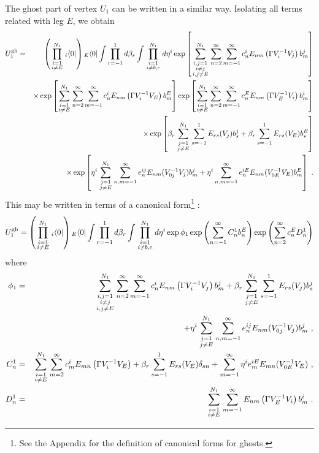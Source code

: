 \documentclass[a4paper,11pt]{article}
\begin{document}
The ghost part of vertex $U_1$ can be written in a similar way. Isolating all terms related with leg $E$, we obtain
\begin{eqnarray}
U^{\rm gh}_1 & = & \left( \prod_{\scriptstyle i=1\atop \scriptstyle i\neq E}^{N_1}{ }_i\langle 0|\right) { }_E\langle 0|\int \prod_{r=-1}^1d\beta _r\int \prod_{\scriptstyle i=1\atop \scriptstyle i\neq b,c}^{N_1}d\eta ^i \exp \left[ \sum_{{\scriptstyle i,j=1\atop \scriptstyle i\neq j}\atop \scriptstyle i,j\neq E}^{N_1}\sum_{n=2}^\infty \sum_{m=-1}^\infty c_n^iE_{nm}\left( \Gamma V^{-1}_iV_j\right) b_m^j\right] \nonumber \\
 & & \times \exp \left[ \sum_{\scriptstyle i=1\atop \scriptstyle i\neq E}^{N_1}\sum_{n=2}^\infty \sum_{m=-1}^\infty c_n^iE_{nm}\left( \Gamma V^{-1}_iV_E\right) b_m^E\right] \exp \left[ \sum_{\scriptstyle i=1\atop \scriptstyle i\neq E}^{N_1}\sum_{n=2}^\infty \sum_{m=-1}^\infty c_n^EE_{nm}\left( \Gamma V^{-1}_EV_i\right) b_m^i\right] \nonumber \\
 & & \times \exp \left[ \beta _r\sum_{\scriptstyle j=1\atop \scriptstyle j\neq E}^{N_1}\sum_{s=-1}^1E_{rs}(V_j)b_s^j+\beta _r\sum_{s=-1}^1E_{rs}(V_E)b_s^E\right] \nonumber \\
 & & \times \exp \left[ \eta ^i\sum_{\scriptstyle j=1\atop \scriptstyle j\neq E}^{N_1}\sum_{n,m=-1}^\infty e_n^{ij}E_{nm}(V_{0j}^{-1}V_j)b_m^j +\eta ^i\sum_{n,m=-1}^\infty e_n^{iE}E_{nm}(V_{0E}^{-1}V_E)b_m^E\right] \ .
\end{eqnarray}
This may be written in terms of a canonical form\footnote{See the Appendix for the definition of canonical forms for ghosts.} \cite{cg2}:
\begin{equation}
U^{\rm gh}_1 = \left( \prod_{\scriptstyle i=1\atop \scriptstyle i\neq E}^{N_1}{ }_i\langle 0|\right) { }_E\langle 0|\int \prod_{r=-1}^1d\beta _r\int \prod_{\scriptstyle i=1\atop \scriptstyle i\neq b,c}^{N_1}d\eta ^i \exp {\phi _1}\exp \left( \sum_{n=-1}^\infty C_n^1b_n^E\right) \exp \left( \sum_{n=2}^\infty c_n^ED_n^1\right) 
\end{equation}
where
\begin{eqnarray}
\phi _1 & = & \sum_{{\scriptstyle i,j=1\atop \scriptstyle i\neq j}\atop \scriptstyle i,j\neq E}^{N_1}\sum_{n=2}^\infty \sum_{m=-1}^\infty c_n^i E_{nm} \left( \Gamma V^{-1}_iV_j\right) b_m^j +\beta _r \sum_{\scriptstyle j=1\atop \scriptstyle j\neq E}^{N_1} \sum_{s=-1}^1 E_{rs}(V_j)b_s^j\nonumber \\ 
 & & +\eta ^i\sum_{\scriptstyle j=1\atop \scriptstyle j\neq E}^{N_1} \sum_{n,m=-1}^\infty e_n^{ij} E_{nm}(V_{0j}^{-1}V_j)b_m^j\ ,\\ 
C_n^1 & = & \sum_{\scriptstyle i=1\atop \scriptstyle i\neq E}^{N_1} \sum_{m=2}^\infty c_m^i E_{mn}\left( \Gamma V^{-1}_iV_E\right) +\beta _r\sum_{s=-1}^1 E_{rs}(V_E) \delta _{sn} +\sum_{m=-1}^\infty \eta ^i e_m^{iE} E_{mn}(V_{0E}^{-1}V_E)\ ,\\ 
D_n^1 & = & \sum_{\scriptstyle i=1\atop \scriptstyle i\neq E}^{N_1}\sum_{m=-1}^\infty E_{nm}\left( \Gamma V^{-1}_EV_i\right) b_m^i\ .
\end{eqnarray}
\end{document}
